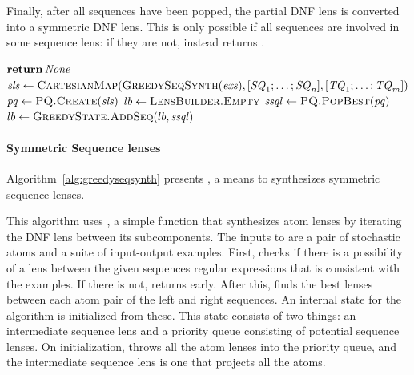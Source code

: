 \documentclass[acmsmall,screen,anonymous]{acmart}
\begin{document}
Finally, after all sequences have been
popped, the partial DNF lens is converted into a symmetric DNF lens. This is
only possible if all sequences are involved in some sequence lens: if they are
not,  instead returns \None.

\begin{algorithm}
  \caption{\GreedySynth}
  \label{alg:greedysynth}
  \begin{algorithmic}[1]
    \State $\ReturnVal{\None}$
    \EndIf
    \State $\SLS \gets
    \Call{\CartesianMap}{\GreedySeqSynth(\Examples),\ListOf{\Sequence_1;\ldots;\Sequence_n},\ListOf{\SequenceAlt_1;\ldots;\SequenceAlt_m}}$
    \State $\GreedyState \gets \Call{PQ.Create}{\SLS}$
    \State $lb \gets \Call{LensBuilder.Empty}{}$
    \State $\SSQLens \gets
    \Call{PQ.PopBest}{\GreedyState}$
    \State $lb \gets \Call{GreedyState.AddSeq}{lb,\SSQLens}$
    \EndIf
    \EndWhile
    \State {}
    \EndFunction
  \end{algorithmic}
\end{algorithm}

\paragraph*{Symmetric Sequence lenses} Algorithm~\ref{alg:greedyseqsynth}
presents \GreedySeqSynth, a means to synthesizes symmetric sequence lenses.

This algorithm uses , a simple function that synthesizes atom
lenses by iterating the DNF lens between its subcomponents. The inputs to
\GreedySeqSynth are a pair of stochastic atoms and a suite of input-output
examples. First,  checks if there is a possibility of a lens
between the given sequences regular expressions that is consistent with the
examples. If there is not, \GreedySeqSynth returns \None early. After this,
\GreedySeqSynth finds the best lenses between each atom pair of the left and
right sequences. An internal state for the algorithm is initialized from these.
This state consists of two things: an intermediate sequence lens and a priority
queue consisting of potential sequence lenses. On initialization,
\GreedySeqSynth throws all the atom lenses into the priority queue, and the
intermediate sequence lens is one that projects all the atoms.
\end{document}
